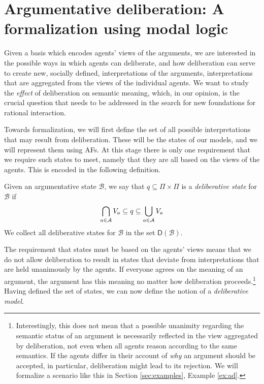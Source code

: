 \documentclass[greybox]{svmult}
\newcommand{\dstate}[1]{\mathsf D({#1}) }
\newcommand{\views}{\mathcal B}
\begin{document}
\section{Argumentative deliberation: A formalization using modal logic}\label{sec:ddl}

Given a basis which encodes agents' views of the arguments, we are interested in the possible ways in which agents can deliberate, and how deliberation can serve to create new, socially defined, interpretations of the arguments, interpretations that are aggregated from the views of the individual agents.  We want to study the \emph{effect} of deliberation on semantic meaning, which, in our opinion, is the crucial question that needs to be addressed in the search for new foundations for rational interaction.

Towards formalization, we will first define the set of all possible interpretations that may result from deliberation. These will be the states of our models, and we will represent them using AFs. At this stage there is only one requirement that we require such states to meet, namely that they are all based on the views of the agents. This is encoded in the following definition.
\begin{definition}\label{def:dstate}
Given an argumentative state $\views$, we say that $q \subseteq \Pi \times \Pi$ is a \emph{deliberative state} for $\views$ if
\begin{equation}\label{eq:ds}
\bigcap_{a \in \agents}V_a \subseteq q \subseteq \bigcup_{a \in \agents}V_a
\end{equation}
We collect all deliberative states for $\views$ in the set $\dstate \views$. 
\end{definition}

The requirement that states must be based on the agents' views means that we do not allow deliberation to result in states that deviate from interpretations that are held unanimously by the agents. If everyone agrees on the meaning of an argument, the argument has this meaning no matter how deliberation proceeds.\footnote{Interestingly, this does not mean that a possible unanimity regarding the semantic status of an argument is necessarily reflected in the view aggregated by deliberation, not even when all agents reason according to the same semantics. If the agents differ in their account of \emph{why} an argument should be accepted, in particular, deliberation might lead to its rejection. We will formalize a scenario like this in Section \ref{sec:examples}, Example \ref{ex:ad}.} Having defined the set of states, we can now define the notion of a \emph{deliberative model}.
\end{document}
